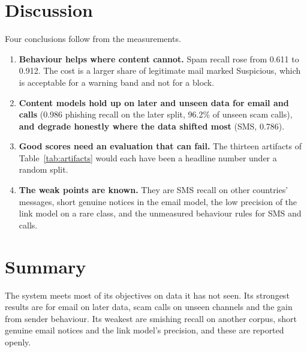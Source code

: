 {\section{Discussion}
Four conclusions follow from the measurements.
\begin{enumerate}
\item \textbf{Behaviour helps where content cannot.} Spam recall rose from 0.611 to 0.912. The cost is a larger share of legitimate mail marked Suspicious, which is acceptable for a warning band and not for a block.
\item \textbf{Content models hold up on later and unseen data for email and calls} (0.986 phishing recall on the later split, 96.2\% of unseen scam calls), \textbf{and degrade honestly where the data shifted most} (SMS, 0.786).
\item \textbf{Good scores need an evaluation that can fail.} The thirteen artifacts of Table~\ref{tab:artifacts} would each have been a headline number under a random split.
\item \textbf{The weak points are known.} They are SMS recall on other countries' messages, short genuine notices in the email model, the low precision of the link model on a rare class, and the unmeasured behaviour rules for SMS and calls.
\end{enumerate}

\section{Summary}
The system meets most of its objectives on data it has not seen. Its strongest results are for email on later data, scam calls on unseen channels and the gain from sender behaviour. Its weakest are smishing recall on another corpus, short genuine email notices and the link model's precision, and these are reported openly.

}
